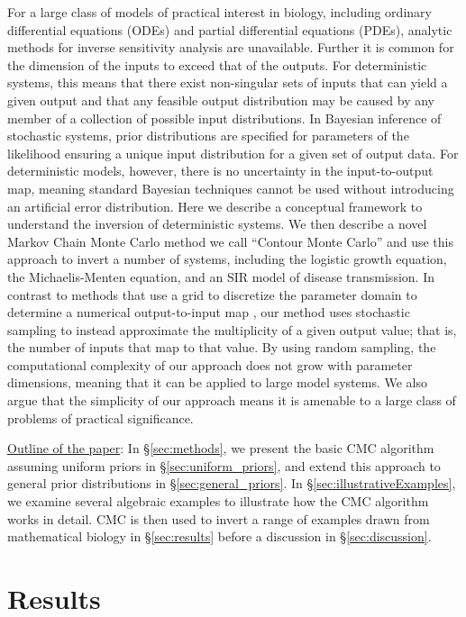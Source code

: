 \documentclass[10pt,letterpaper]{article}
\begin{document}
For a large class of models of practical interest in biology, including ordinary differential equations (ODEs) and partial differential equations (PDEs), analytic methods for inverse sensitivity analysis  are unavailable. Further it is common for the dimension of the inputs to exceed that of the outputs. For deterministic systems, this means that there exist non-singular sets of inputs that can yield a given output and that any feasible output distribution may be caused by any member of a collection of possible input distributions. In Bayesian inference of stochastic systems, prior distributions are specified for parameters of the likelihood ensuring a unique input distribution for a given set of output data. For deterministic models, however, there is no uncertainty in the input-to-output map, meaning standard Bayesian techniques cannot be used without introducing an artificial error distribution. Here we describe a conceptual framework to understand the inversion of deterministic systems. We then describe a novel Markov Chain Monte Carlo method we call ``Contour Monte Carlo'' and use this approach to invert a number of systems, including the logistic growth equation, the Michaelis-Menten equation, and an SIR model of disease transmission. In contrast to methods that use a grid to discretize the parameter domain to determine a numerical output-to-input map \cite{butler2014measure}, our method uses stochastic sampling to instead approximate the multiplicity of a given output value; that is, the number of inputs that map to that value. By using random sampling, the computational complexity of our approach does not grow with parameter dimensions, meaning that it can be applied to large model systems. We also argue that the simplicity of our approach means it is amenable to a large class of problems of practical significance.


\bigskip
\noindent\underline{Outline of the paper}: In \S \ref{sec:methods}, we present the basic CMC algorithm assuming uniform priors in \S \ref{sec:uniform_priors}, and extend this approach to general prior distributions in \S \ref{sec:general_priors}. In \S \ref{sec:illustrativeExamples}, we examine several algebraic examples to illustrate how the CMC algorithm works in detail. CMC is then used to invert a range of examples drawn from mathematical biology in \S \ref{sec:results} before a discussion in \S \ref{sec:discussion}.

\section{Results}
\end{document}
